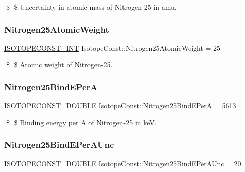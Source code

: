 \$ \$ Uncertainty in atomic mass of Nitrogen-\/25 in amu. \mbox{\label{group___isotope_const-_nitrogen-_n25_ga49dd756a1aedd55c52a2b4e43557ad5b}} 
\subsubsection{\texorpdfstring{Nitrogen25\+Atomic\+Weight}{Nitrogen25AtomicWeight}}
{\footnotesize\ttfamily \mbox{\hyperlink{group___isotope_const-_macros_ga5f18360b3e99483a35c32d789e62621c}{I\+S\+O\+T\+O\+P\+E\+C\+O\+N\+S\+T\+\_\+\+I\+NT}} Isotope\+Const\+::\+Nitrogen25\+Atomic\+Weight = 25}

\$ \$ Atomic weight of Nitrogen-\/25. \mbox{\label{group___isotope_const-_nitrogen-_n25_ga3747b4cff33409037641e0f3c75ba839}} 
\subsubsection{\texorpdfstring{Nitrogen25\+Bind\+E\+PerA}{Nitrogen25BindEPerA}}
{\footnotesize\ttfamily \mbox{\hyperlink{group___isotope_const-_macros_ga8f45a7272ce02c0b4c65c44636ed719a}{I\+S\+O\+T\+O\+P\+E\+C\+O\+N\+S\+T\+\_\+\+D\+O\+U\+B\+LE}} Isotope\+Const\+::\+Nitrogen25\+Bind\+E\+PerA = 5613}

\$ \$ Binding energy per A of Nitrogen-\/25 in keV. \mbox{\label{group___isotope_const-_nitrogen-_n25_ga090b553d8e6c376676e102de688aea07}} 
\subsubsection{\texorpdfstring{Nitrogen25\+Bind\+E\+Per\+A\+Unc}{Nitrogen25BindEPerAUnc}}
{\footnotesize\ttfamily \mbox{\hyperlink{group___isotope_const-_macros_ga8f45a7272ce02c0b4c65c44636ed719a}{I\+S\+O\+T\+O\+P\+E\+C\+O\+N\+S\+T\+\_\+\+D\+O\+U\+B\+LE}} Isotope\+Const\+::\+Nitrogen25\+Bind\+E\+Per\+A\+Unc = 20}

